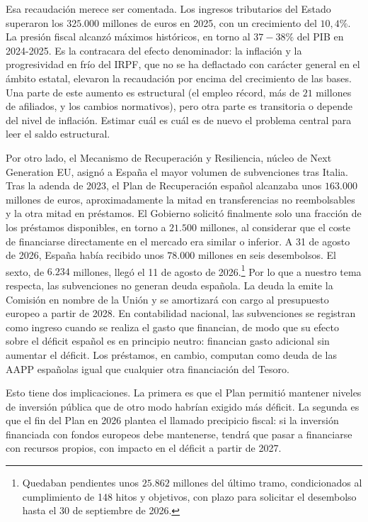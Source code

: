 \documentclass[10pt,a4paper]{article}
\begin{document}
Esa recaudación merece ser comentada. Los ingresos tributarios del Estado superaron los $325.000$ millones de euros en 2025, con un crecimiento del $10,4\%$. La presión fiscal alcanzó máximos históricos, en torno al $37-38\%$ del PIB en 2024-2025. Es la contracara del efecto denominador: la inflación y la progresividad en frío del IRPF, que no se ha deflactado con carácter general en el ámbito estatal, elevaron la recaudación por encima del crecimiento de las bases. Una parte de este aumento es estructural (el empleo récord, más de $21$ millones de afiliados, y los cambios normativos), pero otra parte es transitoria o depende del nivel de inflación. Estimar cuál es cuál es de nuevo el problema central para leer el saldo estructural.

Por otro lado, el Mecanismo de Recuperación y Resiliencia, núcleo de Next Generation EU, asignó a España el mayor volumen de subvenciones tras Italia. Tras la adenda de 2023, el Plan de Recuperación español alcanzaba unos $163.000$ millones de euros, aproximadamente la mitad en transferencias no reembolsables y la otra mitad en préstamos. El Gobierno solicitó finalmente solo una fracción de los préstamos disponibles, en torno a $21.500$ millones, al considerar que el coste de financiarse directamente en el mercado era similar o inferior. A 31 de agosto de 2026, España había recibido unos $78.000$ millones en seis desembolsos. El sexto, de $6.234$ millones, llegó el 11 de agosto de 2026.\footnote{Quedaban pendientes unos $25.862$ millones del último tramo, condicionados al cumplimiento de 148 hitos y objetivos, con plazo para solicitar el desembolso hasta el 30 de septiembre de 2026.
} Por lo que a nuestro tema respecta, las subvenciones no generan deuda española. La deuda la emite la Comisión en nombre de la Unión y se amortizará con cargo al presupuesto europeo a partir de 2028. En contabilidad nacional, las subvenciones se registran como ingreso cuando se realiza el gasto que financian, de modo que su efecto sobre el déficit español es en principio neutro: financian gasto adicional sin aumentar el déficit. Los préstamos, en cambio, computan como deuda de las AAPP españolas igual que cualquier otra financiación del Tesoro.

Esto tiene dos implicaciones. La primera es que el Plan permitió mantener niveles de inversión pública que de otro modo habrían exigido más déficit. La segunda es que el fin del Plan en 2026 plantea el llamado precipicio fiscal: si la inversión financiada con fondos europeos debe mantenerse, tendrá que pasar a financiarse con recursos propios, con impacto en el déficit a partir de 2027.
\end{document}
